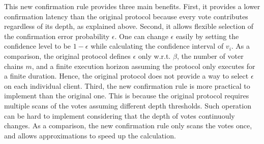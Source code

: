 This new confirmation rule provides three main benefits. First, it provides a lower confirmation latency than the original protocol because every vote contributes regardless of its depth, as explained above. Second, it allows flexible selection of the confirmation error probability $\epsilon$. One can change $\epsilon$ easily by setting the confidence level to be $1 - \epsilon$ while calculating the confidence interval of $v_i$. As a comparison, the original protocol defines $\epsilon$ only w.r.t. $\beta$, the number of voter chains $m$, and a finite execution horizon assuming the protocol only executes for a finite duration. Hence, the original protocol does not provide a way to select $\epsilon$ on each individual client. Third, the new confirmation rule is more practical to implement than the original one. This is because the original protocol requires multiple scans of the votes assuming different depth thresholds. Such operation can be hard to implement considering that the depth of votes continuouly changes. As a comparison, the new confirmation rule only scans the votes once, and allows approximations to speed up the calculation.
